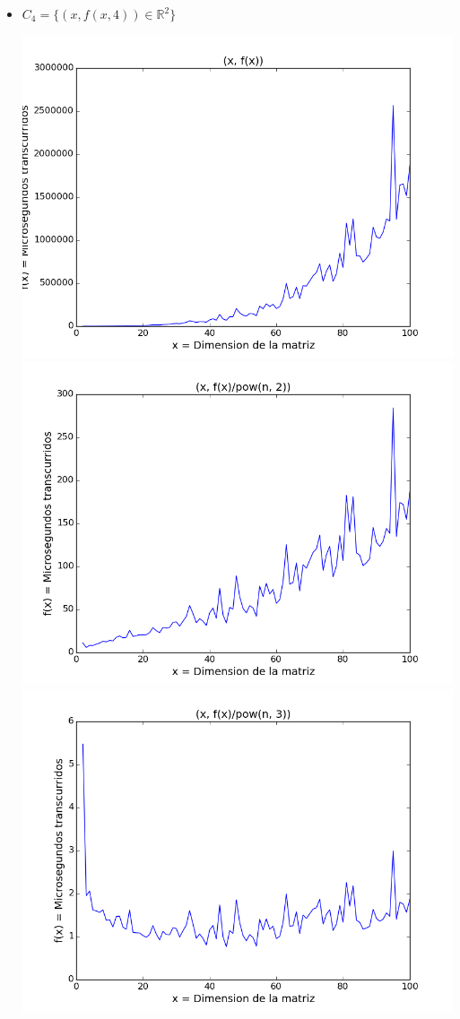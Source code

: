\begin{itemize}
	\item $C_4 = \{ (x, f(x, 4)) \in \mathbb{R}^2 \}$
	\begin{center}
		\includegraphics[scale=0.54]{images/4potenciafuncion}
		\includegraphics[scale=0.54]{images/4potenciasobrecuadrado}
		\includegraphics[scale=0.54]{images/4potenciasobrecubo}
	\end{center}

\end{itemize}

